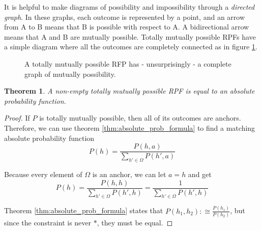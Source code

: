 \documentclass[twoside]{article}
\theoremstyle{plain}%
\newtheorem{theorem}{Theorem}[section]
\theoremstyle{definition}
\theoremstyle{remark}
\begin{document}
It is helpful to make diagrams of possibility and impossibility through a \textit{directed graph}. In these graphs, each outcome is represented by a point, and an arrow from A to B means that B is possible with respect to A. A bidirectional arrow means that A and B are mutually possible. Totally mutually possible RPFs have a simple diagram where all the outcomes are completely connected as in figure \ref{fig:mutually_possible_rpf}.

\begin{figure}[h]
\centering
{}
\caption{A totally mutually possible RFP has - unsurprisingly - a complete graph of mutually possibility.}
\label{fig:mutually_possible_rpf}
\end{figure}

\begin{theorem}
A non-empty totally mutually possible RPF is equal to an absolute probability function.
\end{theorem}

\begin{proof}
If \(P\) is totally mutually possible, then all of its outcomes are anchors. Therefore, we can use theorem \ref{thm:absolute_prob_formula} to find a matching absolute probability function
\[P(h) = \frac{P(h, a)}{\sum_{h' \in \Omega}P(h', a)}\]

Because every element of \(\Omega\) is an anchor, we can let \(a = h\) and get
\[P(h) = \frac{P(h, h)}{\sum_{h' \in \Omega}P(h', h)}=\frac{1}{\sum_{h' \in \Omega}P(h', h)}\]

Theorem \ref{thm:absolute_prob_formula} states that \(P(h_1, h_2) :\cong \frac{P(h_1)}{P(h_2)}\), but since the constraint is never \(\ast\), they must be equal.
\end{proof}
\end{document}
